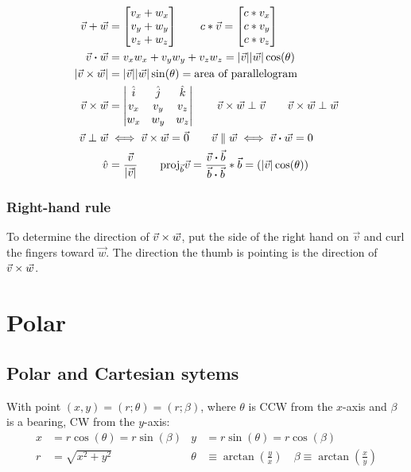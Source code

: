 \[\begin{aligned}
	\vec{v} + \vec{w} &= \begin{bmatrix}
		v_x + w_x \\
		v_y + w_y \\
		v_z + w_z \\
	\end{bmatrix} \qquad
	c * \vec{v} = \begin{bmatrix}
		c * v_x \\
		c * v_y \\
		c * v_z \\
	\end{bmatrix} \\
	\vec{v} \boldsymbol{\cdot} \vec{w} &= v_x w_x + v_y w_y + v_z w_z = |\vec{v}||\vec{w}| \cos(\theta) \\
	|\vec{v} \times \vec{w}| &= |\vec{v}||\vec{w}| \sin(\theta) = \text{area of parallelogram}\\
	\vec{v} \times \vec{w} &= \begin{vmatrix}
		\hat{i} & \hat{j} & \hat{k} \\
		v_x & v_y & v_z \\
		w_x & w_y & w_z
	\end{vmatrix} \qquad \vec{v} \times \vec{w} \perp \vec{v} \qquad \vec{v} \times \vec{w} \perp \vec{w} \\
	\vec{v} \perp \vec{w} &\iff \vec{v} \times \vec{w} = \vec{0} \qquad \vec{v} \parallel \vec{w} \iff \vec{v} \boldsymbol{\cdot} \vec{w} = 0 \\
	\hat{v} &= \frac{\vec{v}}{|\vec{v}|} \qquad
	\text{proj}_{\vec{b}} \vec{v} = \frac{\vec{v} \boldsymbol{\cdot} \vec{b}}{\vec{b} \boldsymbol{\cdot} \vec{b}} * \vec{b} = (|\vec{v}| \cos(\theta))
\end{aligned}\]
\subsubsection{Right-hand rule}
To determine the direction of $\vec{v} \times \vec{w}$, put the side of the right hand on $\vec{v}$ and curl the fingers toward $\vec{w}$. The direction the thumb is pointing is the direction of $\vec{v} \times \vec{w}$.
\section{Polar}
\subsection{Polar and Cartesian sytems}
With point $(x, y) = (r; \theta) = (r; \beta)$, where $\theta$ is CCW from the $x$-axis and $\beta$ is a bearing, CW from the $y$-axis:
\[\begin{aligned}
	x &= r \cos(\theta) = r \sin(\beta) & y &= r \sin(\theta) = r \cos(\beta) \\
	r &= \sqrt{x^2 + y^2} & \theta &\equiv \arctan(\frac{y}{x}) \quad \beta \equiv \arctan(\frac{x}{y})
\end{aligned}\]
